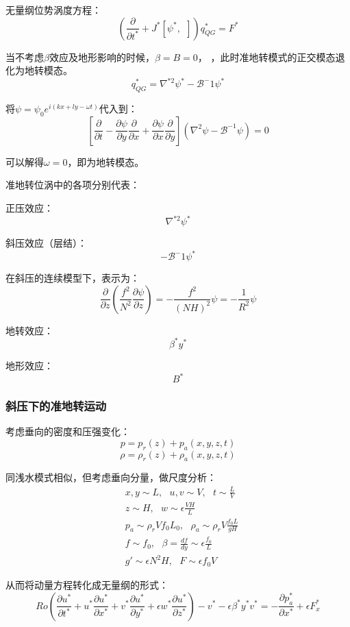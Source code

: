 \documentclass{article}
\begin{document}
无量纲位势涡度方程：
$$\left( \frac{\partial }{\partial {{t}^{*}}}
+{{J}^{*}}\left[ {{\psi }^{*}},\ \  \right] \right)q_{QG}^{*}
={{F}^{*}}$$

当不考虑$\beta$效应及地形影响的时候，$\beta = B = 0$，
，此时准地转模式的正交模态退化为地转模态。
$$ q^*_{QG}= \nabla^{*2}\psi^* - \mathcal{B}^-1\psi^*$$

将$\psi = \psi_0e^{i(kx+ly-\omega t)}$代入到：
$$\left[ \frac{\partial }{\partial t}-\frac{\partial \psi }{\partial y}\frac{\partial }{\partial x}+\frac{\partial \psi }{\partial x}\frac{\partial }{\partial y} \right]\left( {{\nabla }^{2}}\psi -{{\mathcal{B}}^{-1}}\psi  \right)=0$$

可以解得$\omega = 0$，即为地转模态。

准地转位涡中的各项分别代表：

正压效应：
$$ \nabla^{*2}\psi^* $$

斜压效应（层结）：
$$- \mathcal{B}^-1\psi^*$$

在斜压的连续模型下，表示为：
$$\frac{\partial}{\partial z}(\frac{f^2}{N^2}\frac{\partial\psi}{\partial z})
= -\frac{f^2}{(NH)^2}\psi
= -\frac{1}{R^2}\psi$$

地转效应：
$$\beta^*y^*$$

地形效应：
$$B^*$$

\subsubsection{斜压下的准地转运动}
考虑垂向的密度和压强变化：
$$p = p_r(z) + p_a(x,y,z,t)$$
$$\rho = \rho_r(z) + \rho_a(x,y,z,t)$$

同浅水模式相似，但考虑垂向分量，做尺度分析：
\begin{align}
    &x,y\sim L, \ \ \ u,v\sim V, \ \ \ t\sim \frac{L}{V}\\
    &z\sim H, \ \ \ w\sim \epsilon\frac{VH}{L}\\
    &p_a\sim\rho_rVf_0L_0, \ \ \ \rho_a\sim\rho_rV\frac{f_0L}{gH}\\
    &f\sim f_0, \ \ \ \beta=\frac{df}{dy}\sim \epsilon\frac{f_0}{L}\\
    &g'\sim\epsilon N^2H, \ \ \ F\sim \epsilon f_0V
\end{align}

从而将动量方程转化成无量纲的形式：
$$Ro(\frac{\partial u^*}{\partial t^*} 
+ u^*\frac{\partial u^*}{\partial x^*}
+ v^*\frac{\partial u^*}{\partial y^*}
+ \epsilon w^*\frac{\partial u^*}{\partial z^*})
  - v^* - \epsilon \beta^*y^*v^* 
= -\frac{\partial p_a^* }{\partial x^*} + \epsilon F_x^*$$
\end{document}

